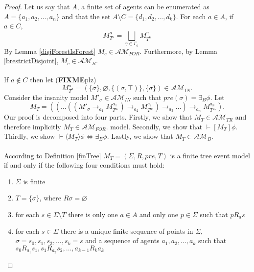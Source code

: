 \documentclass[12pt, a4paper, titlepage]{scrartcl}
\numberwithin{equation}{section}
\newcommand{\sqex}[1]{[{#1}]}
\newcommand{\anex}[1]{\langle {#1} \rangle}
\newcommand{\eventClass}{\mathcal{AM}}
\newcommand{\insaneClass}{\eventClass_{IN}}
\newcommand{\treeClass}{\eventClass_{TR}}
\newcommand{\forestClass}{\eventClass_{FOR}}
\newcommand{\FIXME}{{\bf FIXME}}
\begin{document}
\begin{proof}
Let us say that $A$, a finite set of agents can be enumerated as $A = \{ a_1, a_2, \ldots, a_n\}$
and that the set $A \setminus C = \{d_1, d_2, \ldots, d_k\}$.
For each $a \in A$, if $a \in C$,
\[
	M^a_{T^a} = \bigsqcup_{\gamma \in \Gamma_a} M^\gamma_{T^\gamma}
\]
By Lemma \ref{disjForestIsForest} $M_c \in \forestClass$.
Furthermore, by Lemma \ref{brestrictDisjoint}, $M_c \in \eventClass_B$.\\
\\
If $a \notin C$ then let (\FIXME plz)
\[
	M^a_{T^a} = (\{\sigma\}, \varnothing, \{(\sigma, \top)\}, \{\sigma\}) \in \insaneClass.
\]
Consider the insanity model $M'_\sigma \in \insaneClass$ such that $pre(\sigma) =
\exists_B \phi$.
Let
\[
M_T = ((\ldots((M'_\sigma \to_{a_1} M^{a_1}_{T^{a_1}}) \to_{a_2} M^{c_2}_{T^{a_2}}) \to_{a_3} \ldots )
		\to_{a_n} M^{a_n}_{T^{a_n}}).
\]
Our proof is decomposed into four parts.
Firstly, we show that $M_T \in \treeClass$ and therefore implicitly $M_T \in \forestClass$.
model.
Secondly, we show that $\vdash \sqex{M_T} \phi$.
Thirdly, we show $\vdash \anex{ M_T } \phi \iff \exists_B \phi$.
Lastly, we show that $M_T \in \eventClass_B$.\\
\\
According to Definition \ref{finTree} $M_T = (\Sigma, R, pre, T)$ is a finite tree event model if
and only if the following four conditions must hold:
\begin{enumerate}
	\item $\Sigma$ is finite \label{treeConFinite}
	\item $T = \{\sigma\}$, where $R \sigma = \varnothing$ \label{treeConRoot}
	\item for each $s \in \Sigma \setminus T$ there is only one $a \in A$ and only one $p \in \Sigma$
	such that $p R_a s$ \label{treeConOneAgent}
	\item for each $s \in \Sigma$ there is a unique finite sequence of points in $\Sigma$, $\sigma =
	s_0, s_1, s_2, \ldots, s_k = s$ and a sequence of agents $a_1, a_2, \ldots, a_k$ such that $s_0
	R_{a_1} s_1, s_1 R_{a_2} s_2, \ldots, a_{k-1} R_k
	a_k$ \label{treeConUniquePath}
\end{enumerate}


\end{proof}
\end{document}
